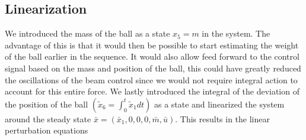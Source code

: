 \subsection{Linearization}

We introduced the mass of the ball as a state $x_{5}=m$ in the system. The advantage of this is that it would then be possible to start estimating the weight of the ball earlier in the sequence.
It would also allow feed forward to the control signal based on the mass and position of the ball, this could have greatly reduced the oscillations of the beam control since we would not require integral action to account for this entire force.
We lastly introduced the integral of the deviation of the position of the
ball $(\tilde{x}_{6}=\int_{0}^{t}\tilde{x}_{1}dt)$ as a state and linearized the system around the steady state $\bar{x}=(\bar{x}_{1},0,0,0,\bar{m},\bar{u})$.
This results in the linear perturbation equations

